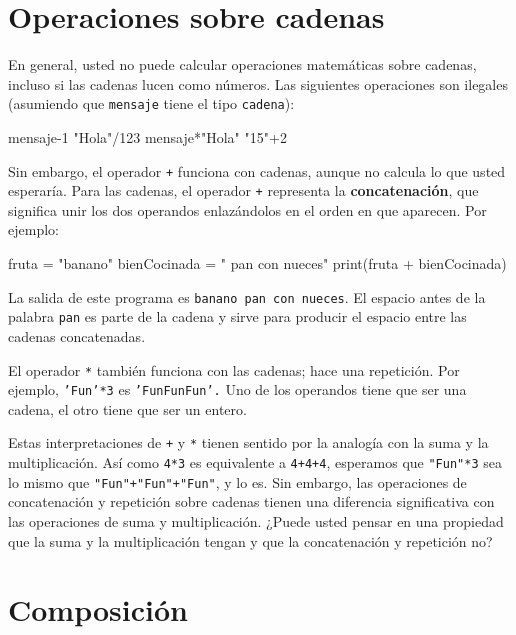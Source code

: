 \section{Operaciones sobre cadenas}


En general, usted no puede calcular operaciones matemáticas sobre
cadenas, incluso si las cadenas lucen como números. Las siguientes
operaciones son ilegales (asumiendo que \texttt{mensaje} tiene el
tipo \texttt{cadena}):

\begin{pythoncode}
 mensaje-1   "Hola"/123   mensaje*"Hola"   "15"+2
\end{pythoncode}

Sin embargo, el operador \texttt{+} funciona con cadenas, aunque no
calcula lo que usted esperaría. Para las cadenas, el operador \texttt{+}
representa la \textbf{concatenación}, que significa unir los dos operandos
enlazándolos en el orden en que aparecen. Por ejemplo:


\begin{pythoncode}
fruta = "banano"
bienCocinada = " pan con nueces"
print(fruta + bienCocinada)
\end{pythoncode}

La salida de este programa es \texttt{banano pan con nueces}. El espacio
antes de la palabra \texttt{pan} es parte de la cadena y sirve para
producir el espacio entre las cadenas concatenadas.

El operador \texttt{{*}} también funciona con las cadenas; hace una
repetición. Por ejemplo, \texttt{'Fun'{*}3} es \texttt{'FunFunFun'.}
Uno de los operandos tiene que ser una cadena, el otro tiene que ser
un entero.

Estas interpretaciones de \texttt{+} y \texttt{{*}} tienen sentido
por la analogía con la suma y la multiplicación. Así como \texttt{4{*}3}
es equivalente a \texttt{4+4+4}, esperamos que \verb+"Fun"*3+ sea
lo mismo que {\verb/"Fun"+"Fun"+"Fun"/}, y lo es. Sin embargo,
las operaciones de concatenación y repetición sobre cadenas tienen
una diferencia significativa con las operaciones de suma y multiplicación.
¿Puede usted pensar en una propiedad que la suma y la multiplicación
tengan y que la concatenación y repetición no?

\section{Composición}

